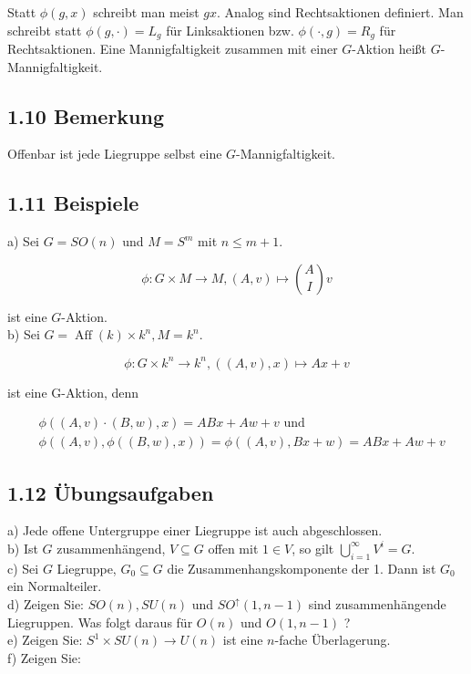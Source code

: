 \documentclass[10pt, letterpaper]{article}
\begin{document}
Statt $\phi(g, x)$ schreibt man meist $g x$. Analog sind Rechtsaktionen definiert. Man schreibt statt $\phi(g, \cdot)=L_{g}$ für Linksaktionen bzw. $\phi(\cdot, g)=R_{g}$ für Rechtsaktionen. Eine Mannigfaltigkeit zusammen mit einer $G$-Aktion heißt $G$-Mannigfaltigkeit.

\subsection*{1.10 Bemerkung}
Offenbar ist jede Liegruppe selbst eine $G$-Mannigfaltigkeit.

\subsection*{1.11 Beispiele}
a) Sei $G=S O(n)$ und $M=S^{m}$ mit $n \leq m+1$.

$$
\phi: G \times M \rightarrow M,(A, v) \mapsto\binom{A}{I} v
$$

ist eine $G$-Aktion.\\
b) Sei $G=\operatorname{Aff}(k) \times k^{n}, M=k^{n}$.

$$
\phi: G \times k^{n} \rightarrow k^{n},((A, v), x) \mapsto A x+v
$$

ist eine G-Aktion, denn

$$
\begin{aligned}
& \phi((A, v) \cdot(B, w), x)=A B x+A w+v \text { und } \\
& \phi((A, v), \phi((B, w), x))=\phi((A, v), B x+w)=A B x+A w+v
\end{aligned}
$$

\subsection*{1.12 Übungsaufgaben}
a) Jede offene Untergruppe einer Liegruppe ist auch abgeschlossen.\\
b) Ist $G$ zusammenhängend, $V \subseteq G$ offen mit $1 \in V$, so gilt $\bigcup_{i=1}^{\infty} V^{i}=G$.\\
c) Sei $G$ Liegruppe, $G_{0} \subseteq G$ die Zusammenhangskomponente der 1. Dann ist $G_{0}$ ein Normalteiler.\\
d) Zeigen Sie: $S O(n), S U(n)$ und $S O^{\uparrow}(1, n-1)$ sind zusammenhängende Liegruppen. Was folgt daraus für $O(n)$ und $O(1, n-1)$ ?\\
e) Zeigen Sie: $S^{1} \times S U(n) \rightarrow U(n)$ ist eine $n$-fache Überlagerung.\\
f) Zeigen Sie:
\end{document}

